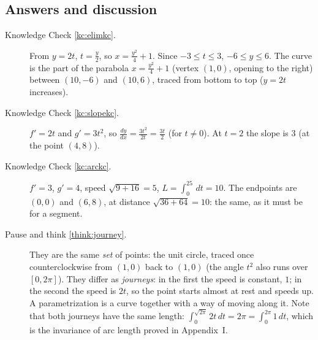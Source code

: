 \documentclass[11pt]{article}
\begin{document}
\subsection*{Answers and discussion}

\begin{description}
  \item[Knowledge Check \ref{kc:elimkc}.] From $y=2t$, $t=\frac y2$, so $x=\frac{y^2}4+1$. Since $-3\le t\le3$, $-6\le y\le6$. The curve is the part of the parabola $x=\frac{y^2}4+1$ (vertex $(1,0)$, opening to the right) between $(10,-6)$ and $(10,6)$, traced from bottom to top ($y=2t$ increases).
  \item[Knowledge Check \ref{kc:slopekc}.] $f'=2t$ and $g'=3t^2$, so $\frac{dy}{dx}=\frac{3t^2}{2t}=\frac{3t}2$ (for $t\ne0$). At $t=2$ the slope is $3$ (at the point $(4,8)$).
  \item[Knowledge Check \ref{kc:arckc}.] $f'=3$, $g'=4$, speed $\sqrt{9+16}=5$, $L=\int_0^25\,dt=10$. The endpoints are $(0,0)$ and $(6,8)$, at distance $\sqrt{36+64}=10$: the same, as it must be for a segment.
  \item[Pause and think \ref{think:journey}.] They are the same \emph{set} of points: the unit circle, traced once counterclockwise from $(1,0)$ back to $(1,0)$ (the angle $t^2$ also runs over $[0,2\pi]$). They differ as \emph{journeys}: in the first the speed is constant, $1$; in the second the speed is $2t$, so the point starts almost at rest and speeds up. A parametrization is a curve together with a way of moving along it. Note that both journeys have the same length: $\int_0^{\sqrt{2\pi}}2t\,dt=2\pi=\int_0^{2\pi}1\,dt$, which is the invariance of arc length proved in Appendix~I.

\end{description}
\end{document}
